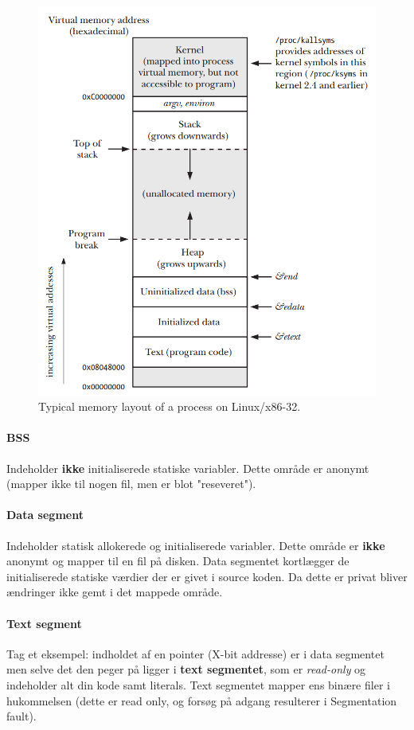 \begin{figure}[H]
	\centering
	\includegraphics[width=0.7\linewidth]{figs/spm1/virtualaddressspace}
	\caption{Typical memory layout of a process on Linux/x86-32.}
	\label{fig:virtualaddressspace}
\end{figure}

\paragraph{BSS}
Indeholder \textbf{ikke} initialiserede statiske variabler. Dette område er anonymt (mapper ikke til nogen fil, men er blot "reseveret").

\paragraph{Data segment}
Indeholder statisk allokerede og initialiserede variabler. Dette område er \textbf{ikke} anonymt og mapper til en fil på disken. Data segmentet kortlægger de initialiserede statiske værdier der er givet i source koden. Da dette er privat bliver ændringer ikke gemt i det mappede område.

\paragraph{Text segment}
Tag et eksempel: indholdet af en pointer (X-bit addresse) er i data segmentet men selve det den peger på ligger i \textbf{text segmentet}, som er \textit{read-only} og indeholder alt din kode samt literals. Text segmentet mapper ens binære filer i hukommelsen (dette er read only, og forsøg på adgang resulterer i Segmentation fault).

